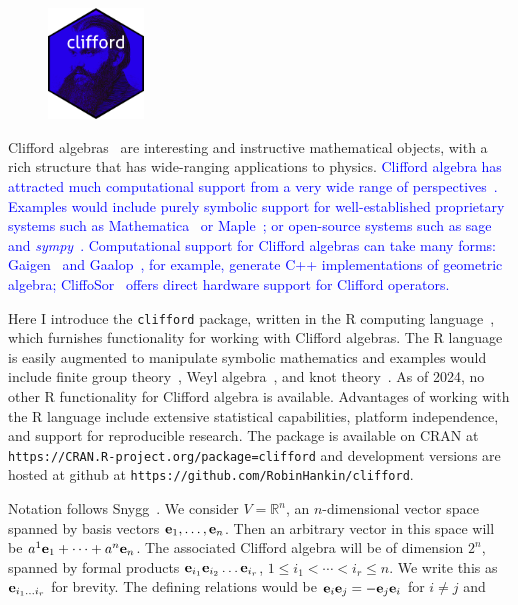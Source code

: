 \documentclass{birkjour}
\theoremstyle{definition}
\theoremstyle{remark}
\numberwithin{equation}{section}
\begin{document}
\setlength{\intextsep}{0pt}
\begin{figure}
  \begin{center}
\includegraphics[width=1in]{clifford.png}
  \end{center}
\end{figure}
Clifford algebras~\cite{hestenes1987} are interesting and instructive
mathematical objects, with a rich structure that has wide-ranging
applications to physics.  \textcolor{blue}{Clifford algebra has
  attracted much computational support from a very wide range of
  perspectives~\cite{burns2020}.  Examples would include purely
  symbolic support for well-established proprietary systems such as
  Mathematica~\cite{aragon2018} or Maple~\cite{ablamowicz2005}; or
  open-source systems such as sage~\cite{sagemath2019,scrimshaw2022}
  and \textit{sympy}~\cite{sympy2017}.  Computational support for
  Clifford algebras can take many forms: Gaigen~\cite{fontijne2006}
  and Gaalop~\cite{hildenbrand2010}, for example, generate C++
  implementations of geometric algebra; CliffoSor~\cite{franchini2008}
  offers direct hardware support for Clifford operators.  }

Here I introduce the {\tt clifford} package, written in the R
computing language~\cite{rcore2022}, which furnishes functionality for
working with Clifford algebras.  The R language is easily augmented to
manipulate symbolic mathematics and examples would include finite
group theory~\cite{hankin2020_permutations}, Weyl
algebra~\cite{hankin2022_weyl_arxiv}, and knot
theory~\cite{hankin2023}.  As of 2024, no other R functionality for
Clifford algebra is available.  Advantages of working with the R
language include extensive statistical capabilities, platform
independence, and support for reproducible research.  The package is
available on CRAN at
\verb+https://CRAN.R-project.org/package=clifford+ and development
versions are hosted at github at
\verb+https://github.com/RobinHankin/clifford+.

\newcommand{\ei}[1]{\ensuremath{{\bf e}_{#1}}}

Notation follows Snygg~\cite{snygg2010}.  We consider
$V=\mathbb{R}^n$, an $n$-dimensional vector space spanned by basis
vectors $\ei{1},\ldots,\ei{n}$.  Then an arbitrary vector in this
space will be $a^1\ei{1}+\cdots+a^n\ei{n}$.  The associated Clifford
algebra will be of dimension $2^n$, spanned by formal products
$\ei{i_1}\ei{i_2}\ldots\ei{i_r}$, $1\leqslant i_1<\cdots<i_r\leqslant
n$.  We write this as $\ei{i_1\ldots i_r}$ for brevity.  The defining
relations would be $\ei{i}\ei{j}=-\ei{j}\ei{i}$ for $i\neq j$ and
\end{document}
